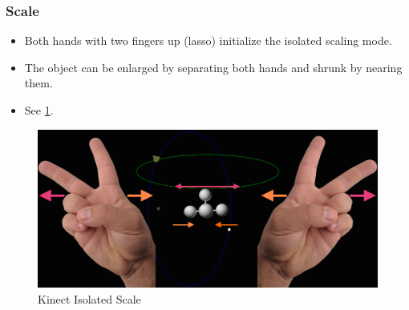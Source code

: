 \documentclass[12pt]{extarticle}
\begin{document}
\begin{appendices}
\subsubsection {Scale}\label{app:subsubsec Scale}
\begin{itemize}
\item Both hands with two fingers up (lasso) initialize the isolated scaling mode. \\
\item The object can be enlarged by separating both hands and shrunk by nearing them.\\
\item See \ref{fig: AKS}.
\end{itemize}
\begin{center}
\begin{figure}[!h]
\includegraphics[scale=0.4]{Images/KinectScale.png}
\caption{Kinect Isolated Scale}
\label{fig: AKS}
\end{figure}
\end{center}

\end{appendices}
\end{document}
